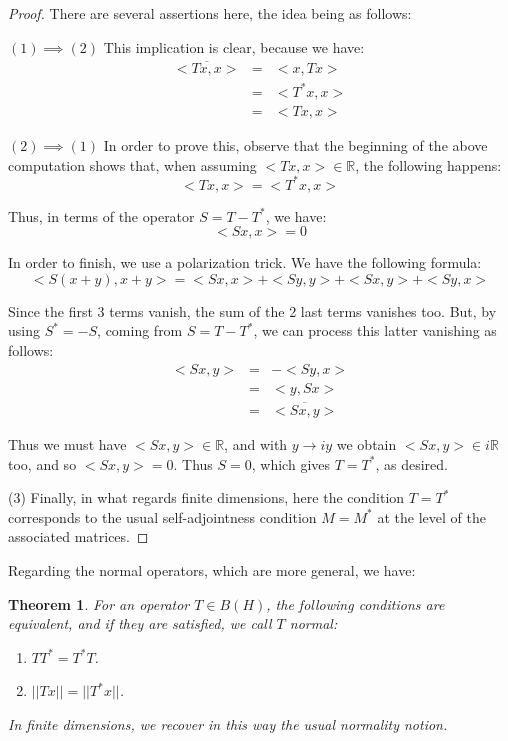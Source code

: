 \documentclass[12pt]{amsbook}
\newtheorem{theorem}{Theorem}[chapter]
\begin{document}
\begin{proof}
There are several assertions here, the idea being as follows:

\medskip

$(1)\implies(2)$ This implication is clear, because we have:
\begin{eqnarray*}
\overline{<Tx,x>}
&=&<x,Tx>\\
&=&<T^*x,x>\\
&=&<Tx,x>
\end{eqnarray*}

$(2)\implies(1)$ In order to prove this, observe that the beginning of the above computation shows that, when assuming $<Tx,x>\in\mathbb R$, the following happens:
$$<Tx,x>=<T^*x,x>$$

Thus, in terms of the operator $S=T-T^*$, we have:
$$<Sx,x>=0$$

In order to finish, we use a polarization trick. We have the following formula:
$$<S(x+y),x+y>=<Sx,x>+<Sy,y>+<Sx,y>+<Sy,x>$$

Since the first 3 terms vanish, the sum of the 2 last terms vanishes too. But, by using $S^*=-S$, coming from $S=T-T^*$, we can process this latter vanishing as follows:
\begin{eqnarray*}
<Sx,y>
&=&-<Sy,x>\\
&=&<y,Sx>\\
&=&\overline{<Sx,y>}
\end{eqnarray*}

Thus we must have $<Sx,y>\in\mathbb R$, and with $y\to iy$ we obtain $<Sx,y>\in i\mathbb R$ too, and so $<Sx,y>=0$. Thus $S=0$, which gives $T=T^*$, as desired.

\medskip

(3) Finally, in what regards finite dimensions, here the condition $T=T^*$ corresponds to the usual self-adjointness condition $M=M^*$ at the level of the associated matrices.
\end{proof}

Regarding the normal operators, which are more general, we have:


\begin{theorem}
For an operator $T\in B(H)$, the following conditions are equivalent, and if they are satisfied, we call $T$ normal:
\begin{enumerate}
\item $TT^*=T^*T$.

\item $||Tx||=||T^*x||$.
\end{enumerate}
In finite dimensions, we recover in this way the usual normality notion.
\end{theorem}
\end{document}
